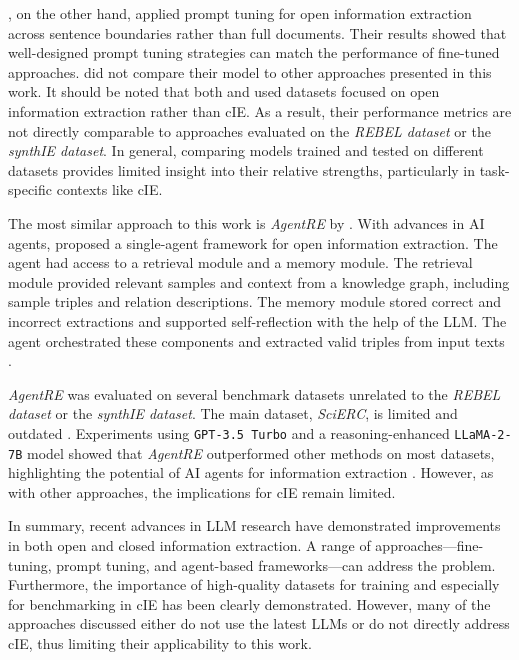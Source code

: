 \documentclass[a4paper,oneside,bibliography=totoc]{scrbook}
\begin{document}
\citet{Chen2024}, on the other hand, applied prompt tuning for open information extraction across sentence boundaries rather than full documents. Their results showed that well-designed prompt tuning strategies can match the performance of fine-tuned approaches. \citet{Chen2024} did not compare their model to other approaches presented in this work. It should be noted that both \citet{Chen2024} and \citet{Xue2024} used datasets focused on open information extraction rather than \ac{cIE}. As a result, their performance metrics are not directly comparable to approaches evaluated on the \textit{REBEL dataset} or the \textit{synthIE dataset}. In general, comparing models trained and tested on different datasets provides limited insight into their relative strengths, particularly in task-specific contexts like \ac{cIE}.

The most similar approach to this work is \textit{AgentRE} by \citet{Shi2024}. With advances in AI agents, \citet{Shi2024} proposed a single-agent framework for open information extraction. The agent had access to a retrieval module and a memory module. The retrieval module provided relevant samples and context from a knowledge graph, including sample triples and relation descriptions. The memory module stored correct and incorrect extractions and supported self-reflection with the help of the \ac{LLM}. The agent orchestrated these components and extracted valid triples from input texts \cite{Shi2024}.

\textit{AgentRE} was evaluated on several benchmark datasets unrelated to the \textit{REBEL dataset} or the \textit{synthIE dataset}. The main dataset, \textit{SciERC}, is limited and outdated \cite{Luan2018}. Experiments using \texttt{GPT-3.5 Turbo} and a reasoning-enhanced \texttt{LLaMA-2-7B} model showed that \textit{AgentRE} outperformed other methods on most datasets, highlighting the potential of AI agents for information extraction \cite{Shi2024}. However, as with other approaches, the implications for \ac{cIE} remain limited.

In summary, recent advances in \ac{LLM} research have demonstrated improvements in both open and closed information extraction. A range of approaches—fine-tuning, prompt tuning, and agent-based frameworks—can address the problem. Furthermore, the importance of high-quality datasets for training and especially for benchmarking in \ac{cIE} has been clearly demonstrated. However, many of the approaches discussed either do not use the latest \acp{LLM} or do not directly address \ac{cIE}, thus limiting their applicability to this work.
\end{document}
